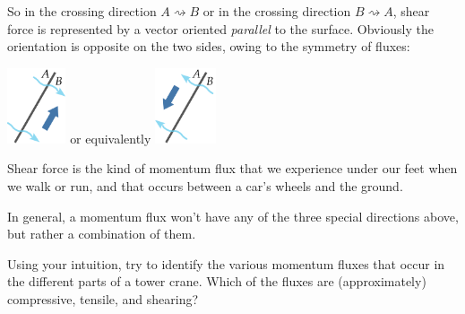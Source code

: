 \documentclass[a4paper,12pt,%
onecolumn,oneside,%
british%
]{memoir}
\providecommand{\href}[2]{#2}
\renewcommand*{\|}[1][]{\nonscript\:#1\vert\nonscript\:\mathopen{}}
\newcommand*{\furl}[2]{\href{#1}{#2}\pagenote{\url{#1}}}
\begin{document}
So in the crossing direction $A\!\rightsquigarrow\!B$ or in the crossing direction $B\!\rightsquigarrow\!A$, shear force is represented by a vector oriented \emph{parallel} to the surface. Obviously the orientation is opposite on the two sides, owing to the symmetry of fluxes:\noprelistbreak
\begin{center}\medskip
  \hspace*{\fill}
  \includegraphics[align=c,height=6em]{images/shearforce_right.pdf}
  \hfill{\small or equivalently}\hfill
  \includegraphics[align=c,height=6em]{images/shearforce_left.pdf}
  \hspace*{\fill}
\end{center}

Shear force is the kind of momentum flux that we experience under our feet when we walk or run, and that occurs between a car's wheels and the ground.

\bigskip

In general, a momentum flux won't have any of the three special directions above, but rather a combination of them.


\begin{exercise}
  Using your intuition, try to identify the various momentum fluxes that occur in the different parts of a tower crane. Which of the fluxes are (approximately) compressive, tensile, and shearing?
\end{exercise}
\end{document}
